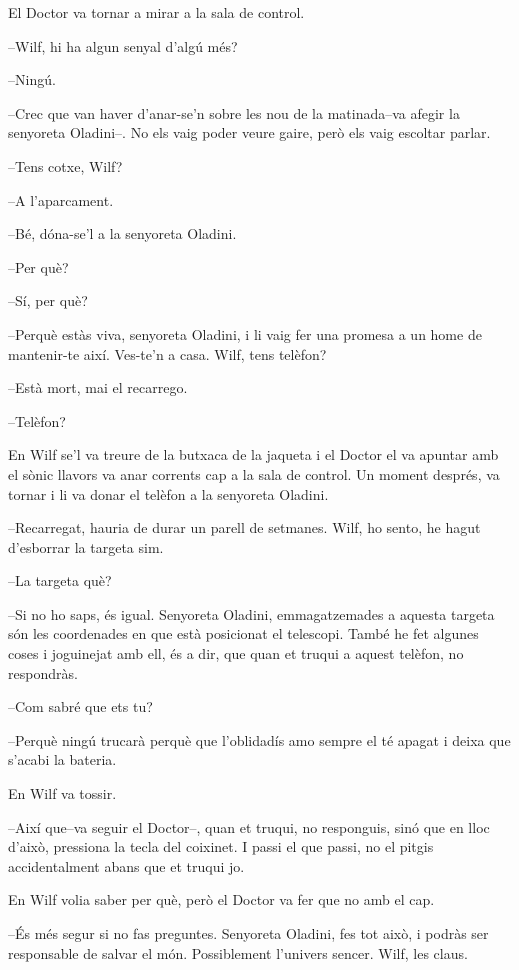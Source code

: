 El Doctor va tornar a mirar a la sala de control.

--Wilf, hi ha algun senyal d'algú més?

--Ningú.

--Crec que van haver d'anar-se'n sobre les nou de la matinada--va afegir
la senyoreta Oladini--. No els vaig poder veure gaire, però els vaig
escoltar parlar.

--Tens cotxe, Wilf?

--A l'aparcament.

--Bé, dóna-se'l a la senyoreta Oladini.

--Per què?

--Sí, per què?

--Perquè estàs viva, senyoreta Oladini, i li vaig fer una promesa a un
home de mantenir-te així. Ves-te'n a casa. Wilf, tens telèfon?

--Està mort, mai el recarrego.

--Telèfon?

En Wilf se'l va treure de la butxaca de la jaqueta i el Doctor el va
apuntar amb el sònic llavors va anar corrents cap a la sala de control.
Un moment després, va tornar i li va donar el telèfon a la senyoreta
Oladini.

--Recarregat, hauria de durar un parell de setmanes. Wilf, ho sento, he
hagut d'esborrar la targeta sim.

--La targeta què?

--Si no ho saps, és igual. Senyoreta Oladini, emmagatzemades a aquesta
targeta són les coordenades en que està posicionat el telescopi. També
he fet algunes coses i joguinejat amb ell, és a dir, que quan et truqui
a aquest telèfon, no respondràs.

--Com sabré que ets tu?

--Perquè ningú trucarà perquè que l'oblidadís amo sempre el té apagat i
deixa que s'acabi la bateria.

En Wilf va tossir.

--Així que--va seguir el Doctor--, quan et truqui, no responguis, sinó
que en lloc d'això, pressiona la tecla del coixinet. I passi el que
passi, no el pitgis accidentalment abans que et truqui jo.

En Wilf volia saber per què, però el Doctor va fer que no amb el cap.

--És més segur si no fas preguntes. Senyoreta Oladini, fes tot això, i
podràs ser responsable de salvar el món. Possiblement l'univers sencer.
Wilf, les claus.

